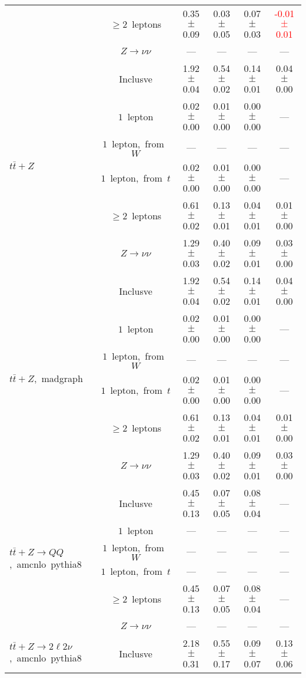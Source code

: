 \documentclass{article}
\begin{document}
\begin{longtable}{|l|c|c|c|c|c|}
 & $\ge2$~leptons  & 0.35 $\pm$ 0.09  & 0.03 $\pm$ 0.05  & 0.07 $\pm$ 0.03  & \textcolor{red}{ -0.01 $\pm$ 0.01 } \\* 
 & $Z\rightarrow\nu\nu$  & ---  & ---  & ---  & --- \\* 
\hline 
\multirow{6}{*}{$t\bar{t}+Z$} & Inclusve  & 1.92 $\pm$ 0.04  & 0.54 $\pm$ 0.02  & 0.14 $\pm$ 0.01  & 0.04 $\pm$ 0.00 \\* 
 & $1$~lepton  & 0.02 $\pm$ 0.00  & 0.01 $\pm$ 0.00  & 0.00 $\pm$ 0.00  & --- \\* 
 & $1$~lepton,~from~$W$  & ---  & ---  & ---  & --- \\* 
 & $1$~lepton,~from~$t$  & 0.02 $\pm$ 0.00  & 0.01 $\pm$ 0.00  & 0.00 $\pm$ 0.00  & --- \\* 
 & $\ge2$~leptons  & 0.61 $\pm$ 0.02  & 0.13 $\pm$ 0.01  & 0.04 $\pm$ 0.01  & 0.01 $\pm$ 0.00 \\* 
 & $Z\rightarrow\nu\nu$  & 1.29 $\pm$ 0.03  & 0.40 $\pm$ 0.02  & 0.09 $\pm$ 0.01  & 0.03 $\pm$ 0.00 \\* 
\hline 
\multirow{6}{*}{$t\bar{t}+Z$,~madgraph} & Inclusve  & 1.92 $\pm$ 0.04  & 0.54 $\pm$ 0.02  & 0.14 $\pm$ 0.01  & 0.04 $\pm$ 0.00 \\* 
 & $1$~lepton  & 0.02 $\pm$ 0.00  & 0.01 $\pm$ 0.00  & 0.00 $\pm$ 0.00  & --- \\* 
 & $1$~lepton,~from~$W$  & ---  & ---  & ---  & --- \\* 
 & $1$~lepton,~from~$t$  & 0.02 $\pm$ 0.00  & 0.01 $\pm$ 0.00  & 0.00 $\pm$ 0.00  & --- \\* 
 & $\ge2$~leptons  & 0.61 $\pm$ 0.02  & 0.13 $\pm$ 0.01  & 0.04 $\pm$ 0.01  & 0.01 $\pm$ 0.00 \\* 
 & $Z\rightarrow\nu\nu$  & 1.29 $\pm$ 0.03  & 0.40 $\pm$ 0.02  & 0.09 $\pm$ 0.01  & 0.03 $\pm$ 0.00 \\* 
\hline 
\multirow{6}{*}{$t\bar{t}+Z{\rightarrow}QQ$,~amcnlo~pythia8} & Inclusve  & 0.45 $\pm$ 0.13  & 0.07 $\pm$ 0.05  & 0.08 $\pm$ 0.04  & --- \\* 
 & $1$~lepton  & ---  & ---  & ---  & --- \\* 
 & $1$~lepton,~from~$W$  & ---  & ---  & ---  & --- \\* 
 & $1$~lepton,~from~$t$  & ---  & ---  & ---  & --- \\* 
 & $\ge2$~leptons  & 0.45 $\pm$ 0.13  & 0.07 $\pm$ 0.05  & 0.08 $\pm$ 0.04  & --- \\* 
 & $Z\rightarrow\nu\nu$  & ---  & ---  & ---  & --- \\* 
\hline 
\multirow{6}{*}{$t\bar{t}+Z{\rightarrow}2{\ell}2{\nu}$,~amcnlo~pythia8} & Inclusve  & 2.18 $\pm$ 0.31  & 0.55 $\pm$ 0.17  & 0.09 $\pm$ 0.07  & 0.13 $\pm$ 0.06 \\* 

\end{longtable}
\end{document}
